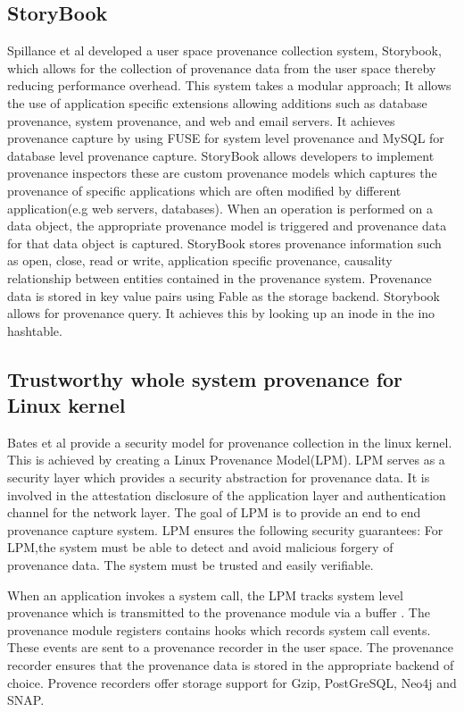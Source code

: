 \subsection{StoryBook}
Spillance et al \cite{story} developed a user space provenance collection system, Storybook, which allows for the collection of provenance data from the user space thereby reducing performance overhead. This system takes a modular approach; It allows the use of application specific extensions allowing additions such as database provenance, system provenance, and web and email servers. It achieves provenance capture by using FUSE for system level provenance and MySQL for database level provenance capture. StoryBook allows developers to implement provenance inspectors these are custom provenance models which captures the provenance of specific applications which are often modified by different application(e.g web servers, databases). When an operation is performed on a data object, the appropriate provenance model is triggered and provenance data for that data object is captured. StoryBook stores provenance information such as open, close, read or write, application specific provenance, causality relationship between entities contained in the provenance system. Provenance data is stored in key value pairs using Fable as the storage backend. Storybook allows for provenance query. It achieves this by looking up an inode in the ino hashtable.



\subsection{Trustworthy whole system provenance for Linux kernel}

Bates et al \cite{bates_towards_2013} provide a security model for provenance collection in the linux kernel. This is achieved by creating a Linux Provenance Model(LPM). LPM serves as a security layer which provides a security abstraction for provenance data. It is involved in the attestation disclosure of the application layer and authentication channel for the network layer. The goal of LPM is to provide an end to end provenance capture system. LPM ensures the following security guarantees: For LPM,the system must be able to detect and avoid malicious forgery of provenance data. The system must be trusted and easily verifiable. \par When an application invokes a system call, the LPM tracks system level provenance which is transmitted to the provenance module via a buffer . The provenance module registers contains hooks which records system call events. These events are sent to a provenance recorder in the user space. The provenance recorder ensures that the provenance data is stored in the appropriate backend of choice. Provence recorders offer storage support for Gzip, PostGreSQL, Neo4j and SNAP.



